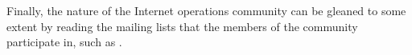 Finally, the nature of the Internet operations community can be gleaned to some
extent by reading the mailing lists that the members of the community
participate in, such as \cite{NANOG}.

%
